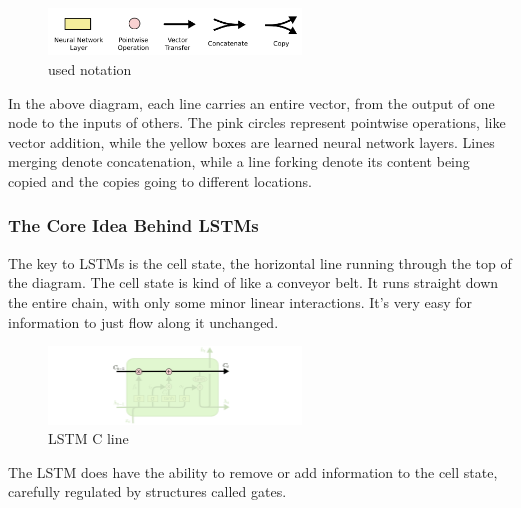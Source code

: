 {\begin{figure}[htp]
\centering
\includegraphics[width=0.60\textwidth]{pictures/LSTM2-notation.png}
\caption[LSTM anotation]{used notation\protect\footnotemark}
\end{figure}
In the above diagram, each line carries an entire vector, from the output of one node to the inputs of others. The pink circles represent pointwise operations, like vector addition, while the yellow boxes are learned neural network layers. Lines merging denote concatenation, while a line forking denote its content being copied and the copies going to different locations. 

\subsubsection{The Core Idea Behind LSTMs}

The key to LSTMs is the cell state, the horizontal line running through the top of the diagram.
The cell state is kind of like a conveyor belt. It runs straight down the entire chain, with only some minor linear interactions. It’s very easy for information to just flow along it unchanged.
\renewcommand{\figurename}{Abb.}
\begin{figure}[htp]
\centering
\includegraphics[width=0.60\textwidth]{pictures/LSTM3-C-line.png}
\caption[LSTM C line]{LSTM C line\protect\footnotemark}
\end{figure}
The LSTM does have the ability to remove or add information to the cell state, carefully regulated by structures called gates.

}
